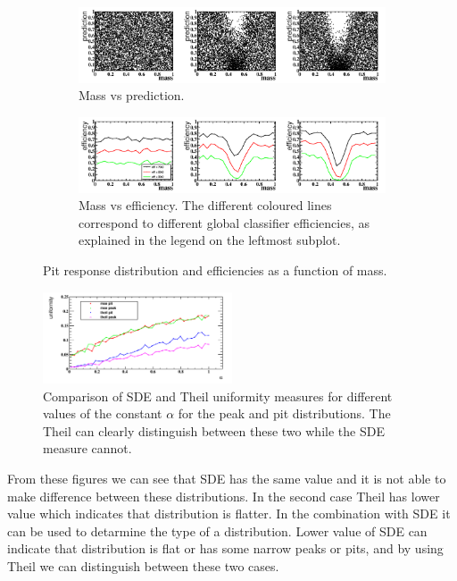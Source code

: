 {\begin{figure}[H]
\label{fig:pitdists}
\centering
		\begin{subfigure}[b]{0.95\textwidth}
			\includegraphics[width=\textwidth]{graphs/PitDistributions.png}
			\caption{Mass vs prediction.}
		\end{subfigure}
		\begin{subfigure}[b]{0.95\textwidth}
			\includegraphics[width=\textwidth]{graphs/PitEffs.png}
			\caption{Mass vs efficiency. The different coloured lines correspond to
different global classifier efficiencies, as explained in the legend on the leftmost subplot.}
		\end{subfigure}
		\caption{Pit response distribution and efficiencies as a function of mass.}
\end{figure}

\begin{figure}[H]
\centering
	\includegraphics[width=0.5\textwidth]{graphs/TheilVsMSE.png}
	\caption{Comparison of SDE and Theil uniformity measures for different values of the constant $\alpha$ for the peak and pit distributions.
The Theil can clearly distinguish between these two while the SDE measure cannot.}
\end{figure}

From these figures we can see that SDE has the same value and it is not able to make difference between these distributions. In the second case Theil has lower value which indicates that distribution is flatter. In the combination with SDE it can be used to detarmine the type of a distribution. Lower value of SDE can indicate that distribution is flat or has some narrow peaks or pits, and by using Theil we can distinguish between these two cases.

}
